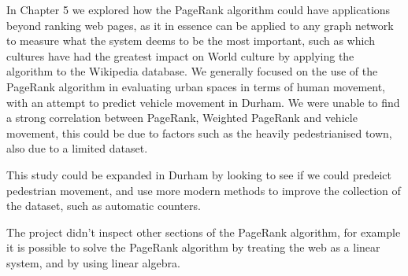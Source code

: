 \documentclass[11pt]{report}
\begin{document}
In Chapter 5 we explored how the PageRank algorithm could have applications beyond ranking web pages, as it in essence can be applied to any graph network to measure what the system deems to be the most important, such as which cultures have had the greatest impact on World culture by applying the algorithm to the Wikipedia database. We generally focused on the use of the PageRank algorithm in evaluating urban spaces in terms of human movement, with an attempt to predict vehicle movement in Durham. We were unable to find a strong correlation between PageRank, Weighted PageRank and vehicle movement, this could be due to factors such as the heavily pedestrianised town, also due to a limited dataset.

This study could be expanded in Durham by looking to see if we could predeict pedestrian movement, and use more modern methods to improve the collection of the dataset, such as automatic counters. 

The project didn't inspect other sections of the PageRank algorithm, for example it is possible to solve the PageRank algorithm by treating the web as a linear system, and by using linear algebra. 
\end{document}
